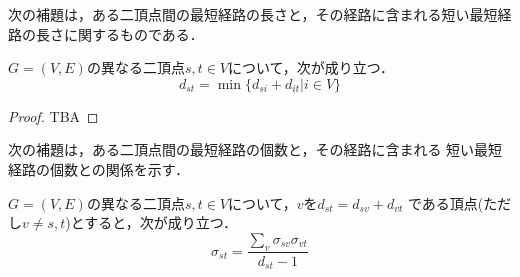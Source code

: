 次の補題は，ある二頂点間の最短経路の長さと，その経路に含まれる短い最短経路の長さに関するものである．
\begin{lemma}
  \label{lemma:distance-of-path}
  $G=(V,E)$の異なる二頂点$s,t\in V$について，次が成り立つ．
  \begin{equation*}
    d_{st}=\min\{d_{si}+d_{it}|i\in V\}
  \end{equation*}
\end{lemma}
\begin{proof}
  TBA
\end{proof}

次の補題は，ある二頂点間の最短経路の個数と，その経路に含まれる
短い最短経路の個数との関係を示す．
\begin{lemma}
  \label{lemma:number-of-paths}
  $G=(V,E)$の異なる二頂点$s,t\in V$について，$v$を$d_{st}=d_{sv}+d_{vt}$
  である頂点(ただし$v\neq s,t$)とすると，次が成り立つ．
  \begin{equation}
    \label{eq:number-of-paths}
    \sigma_{st}=\frac{\sum_{v}\sigma_{sv}\sigma_{vt}}{d_{st}-1}
  \end{equation}
\end{lemma}
